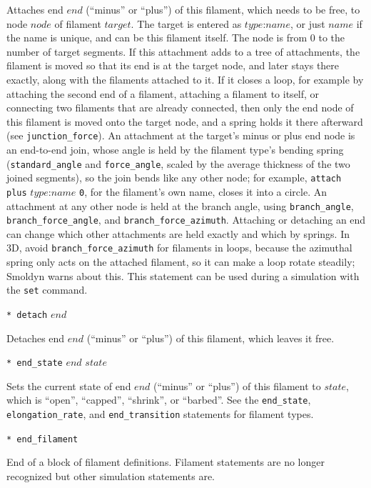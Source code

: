 \documentclass {scrbook}
\newcommand {\ttt} {\texttt}
\begin{document}
\begin{description}
Attaches end $end$ (``minus'' or ``plus'') of this filament, which needs to be free, to node $node$ of filament $target$. The target is entered as $type$:$name$, or just $name$ if the name is unique, and can be this filament itself. The node is from 0 to the number of target segments. If this attachment adds to a tree of attachments, the filament is moved so that its end is at the target node, and later stays there exactly, along with the filaments attached to it. If it closes a loop, for example by attaching the second end of a filament, attaching a filament to itself, or connecting two filaments that are already connected, then only the end node of this filament is moved onto the target node, and a spring holds it there afterward (see \ttt{junction\_force}). An attachment at the target's minus or plus end node is an end-to-end join, whose angle is held by the filament type's bending spring (\ttt{standard\_angle} and \ttt{force\_angle}, scaled by the average thickness of the two joined segments), so the join bends like any other node; for example, \ttt{attach plus} $type$:$name$ \ttt{0}, for the filament's own name, closes it into a circle. An attachment at any other node is held at the branch angle, using \ttt{branch\_angle}, \ttt{branch\_force\_angle}, and \ttt{branch\_force\_azimuth}. Attaching or detaching an end can change which other attachments are held exactly and which by springs. In 3D, avoid \ttt{branch\_force\_azimuth} for filaments in loops, because the azimuthal spring only acts on the attached filament, so it can make a loop rotate steadily; Smoldyn warns about this. This statement can be used during a simulation with the \ttt{set} command.

\item{\ttt{* detach} $end$}

Detaches end $end$ (``minus'' or ``plus'') of this filament, which leaves it free.

\item{\ttt{* end\_state} $end$ $state$}

Sets the current state of end $end$ (``minus'' or ``plus'') of this filament to $state$, which is ``open'', ``capped'', ``shrink'', or ``barbed''. See the \ttt{end\_state}, \ttt{elongation\_rate}, and \ttt{end\_transition} statements for filament types.

\item{\ttt{* end\_filament}}

End of a block of filament definitions. Filament statements are no longer recognized but other simulation statements are.

\end{description}
\end{document}
